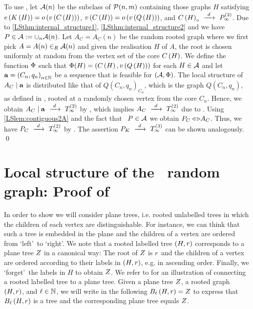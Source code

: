 To use , let $\mathcal{A}(n)$ be the subclass of $\mathcal{P}(n,m)$ containing those graphs $H$ satisfying $e\left({K\left(H\right)}\right)=o\left(v\left({C\left(H\right)}\right)\right)$, $v\left({C\left(H\right)}\right)=o\left(v\left({Q\left(H\right)}\right)\right)$, and $C\left(H\right)_\circ~\xrightarrow{~d~}~P_{\infty}^{\left(2\right)}$. Due to \ref{LSthm:internal_structure1}, \ref{LSthm:internal_structure2} and  we have \whp\ $P\in \mathcal{A}:=\cup_n\mathcal{A}(n)$. Let $A_C=A_C(n)$ be the random rooted graph where we first pick $A=A(n)\in_R\mathcal{A}(n)$ and given the realisation $H$ of $A$, the root is chosen uniformly at random from the vertex set of the core $C\left(H\right)$. We define the function $\Phi$ such that $\Phi(H)=\left(C\left(H\right), v\left({Q\left(H\right)}\right)\right)$ for each $H\in\mathcal{A}$ and let $\mathbf{a}=\left(C_n, q_n\right)_{n\in\mathbb{N}}$ be a sequence that is feasible for $\left(\mathcal{A}, \Phi\right)$. The local structure of $A_C \mid \mathbf{a}$ is distributed like that of $Q(C_n, q_n)_{C_n}$, which is the graph $Q(C_n, q_n)$, as defined in , rooted at a randomly chosen vertex from the core $C_n$. Hence, we obtain $A_C \mid \mathbf{a}~\xrightarrow{~d~}~T_\infty^{\left(2\right)}$ by , which implies  $A_C~\xrightarrow{~d~}~T_\infty^{\left(2\right)}$ due to . Using \ref{LSlem:contiguous2A} and the fact that \whp\ $P\in \mathcal{A}$ we obtain $P_C \triangleleft \triangleright A_C$. Thus, we have $P_C~\xrightarrow{~d~}~T_\infty^{\left(2\right)}$ by . The assertion $P_K~\xrightarrow{~d~}~T_\infty^{\left(3\right)}$ can be shown analogously. \qed

\section[Local structure of the \ER\ random graph]{Local structure of the \ER\ random graph: Proof of }\label{LSapp:local_er}
In order to show  we will consider plane trees, i.e. rooted unlabelled trees in which the children of each vertex are distinguishable. For instance, we can think that such a tree is embedded in the plane and the children of a vertex are ordered from \lq left\rq\ to \lq right\rq. We note that a rooted labelled tree $\left(H, r\right)$ corresponds to a plane tree $Z$ in a canonical way: The root of $Z$ is $r$ and the children of a vertex are ordered according to their labels in $\left(H, r\right)$, e.g. in ascending order. Finally, we \lq forget\rq\ the labels in $H$ to obtain $Z$. We refer to  for an illustration of connecting a rooted labelled tree to a plane tree. Given a plane tree $Z$, a rooted graph $\left(H, r\right)$, and $\ell\in\mathbb{N}$, we will write in the following $B_{\ell}\left(H, r\right)=Z$ to express that $B_{\ell}\left(H, r\right)$ is a tree and the corresponding plane tree equals $Z$. 

